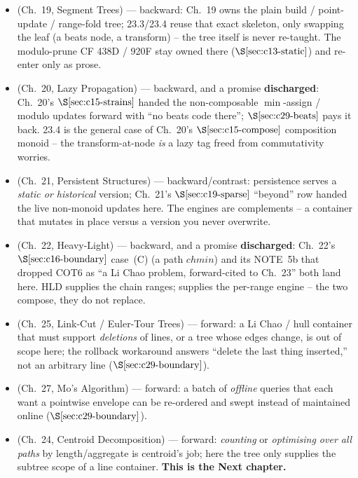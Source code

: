 
\begin{itemize}[nosep, leftmargin=1.4em]
  \item {} (Ch.~19, Segment Trees) --- backward: Ch.~19 owns the plain build / point-update /
        range-fold tree; 23.3/23.4 reuse that exact skeleton, only swapping the leaf (a beats node, a
        transform) -- the tree itself is never re-taught. The modulo-prune CF 438D / 920F stay owned
        there (\(\secref{c13-static}\)) and re-enter only as prose.
  \item {} (Ch.~20, Lazy Propagation) --- backward, and a promise \textbf{discharged}: Ch.~20's
        \(\secref{c15-strains}\) handed the non-composable \(\min\)-assign / modulo updates forward with
        ``no beats code there''; \(\secref{c29-beats}\) pays it back. 23.4 is the general case of
        Ch.~20's \(\secref{c15-compose}\) composition monoid -- the transform-at-node \emph{is} a lazy
        tag freed from commutativity worries.
  \item {} (Ch.~21, Persistent Structures) --- backward/contrast: persistence serves a
        \emph{static or historical} version; Ch.~21's \(\secref{c19-sparse}\) ``beyond'' row handed the
        live non-monoid updates here. The engines are complements -- a container that mutates in place
        versus a version you never overwrite.
  \item {} (Ch.~22, Heavy-Light) --- backward, and a promise \textbf{discharged}: Ch.~22's
        \(\secref{c16-boundary}\) case~(C) (a path \(\mathit{chmin}\)) and its NOTE~5b that dropped
        COT6 as ``a Li Chao problem, forward-cited to Ch.~23'' both land here. HLD supplies the chain
        ranges;  supplies the per-range engine -- the two compose, they do not replace.
  \item {} (Ch.~25, Link-Cut / Euler-Tour Trees) --- forward: a Li Chao / hull container that
        must support \emph{deletions} of lines, or a tree whose edges change, is out of scope here; the
        rollback workaround answers ``delete the last thing inserted,'' not an arbitrary line
        (\(\secref{c29-boundary}\)).
  \item {} (Ch.~27, Mo's Algorithm) --- forward: a batch of \emph{offline} queries that each
        want a pointwise envelope can be re-ordered and swept instead of maintained online
        (\(\secref{c29-boundary}\)).
  \item {} (Ch.~24, Centroid Decomposition) --- forward: \emph{counting} or \emph{optimising
        over all paths} by length/aggregate is centroid's job; here the tree only supplies the subtree
        scope of a line container. \textbf{This is the Next chapter.}
\end{itemize}

